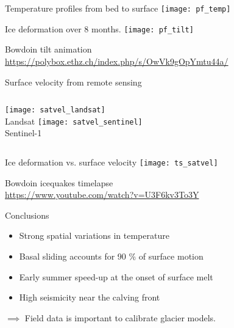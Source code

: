     \begin{frame}{Temperature profiles from bed to surface}
      \centering
      \texttt{[image: pf\_temp]}
    \end{frame}

    \begin{frame}{Ice deformation over 8 months.}
      \centering
      \texttt{[image: pf\_tilt]}
    \end{frame}

    \begin{frame}{}
      \centering
      Bowdoin tilt animation\\
      \bigskip
      \url{https://polybox.ethz.ch/index.php/s/OwVk9gOpYmtu44a/}
    \end{frame}

    \begin{frame}{Surface velocity from remote sensing}
      \begin{columns}
        \column{60mm}
          \centering
          \texttt{[image: satvel\_landsat]}\\
          Landsat
        \column{60mm}
          \centering
          \texttt{[image: satvel\_sentinel]}\\
          Sentinel-1
      \end{columns}
    \end{frame}

    \begin{frame}{Ice deformation vs. surface velocity}
      \centering
      \texttt{[image: ts\_satvel]}
    \end{frame}

    \begin{frame}{}
      \centering
      Bowdoin icequakes timelapse\\
      \bigskip
      \url{https://www.youtube.com/watch?v=U3F6kv3To3Y}\\
    \end{frame}

    \begin{frame}{Conclusions}
      \begin{itemize}
        \item Strong spatial variations in temperature
        \bigskip
        \item Basal sliding accounts for 90 \% of surface motion
        \bigskip
        \item Early summer speed-up at the onset of surface melt
        \bigskip
        \item High seismicity near the calving front
      \end{itemize}
      \pause\bigskip
      $\implies$ Field data is important to calibrate glacier models.
    \end{frame}
